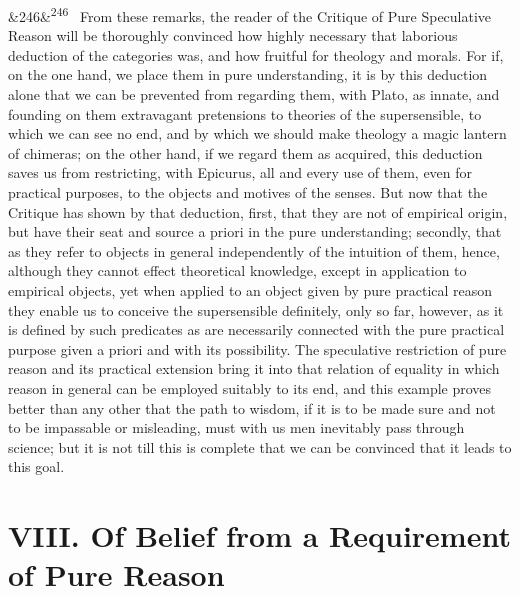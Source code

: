 \documentclass[12pt]{article}
\newcommand{\para}[1][]{\par\noindent\ifx&#1&\else\textsuperscript{\footnotesize #1}~\fi}
\begin{document}
\para[246] From these remarks, the reader of the Critique of Pure Speculative Reason will be thoroughly convinced how highly necessary that laborious deduction of the categories was, and how fruitful for theology and morals. For if, on the one hand, we place them in pure understanding, it is by this deduction alone that we can be prevented from regarding them, with Plato, as innate, and founding on them extravagant pretensions to theories of the supersensible, to which we can see no end, and by which we should make theology a magic lantern of chimeras; on the other hand, if we regard them as acquired, this deduction saves us from restricting, with Epicurus, all and every use of them, even for practical purposes, to the objects and motives of the senses. But now that the Critique has shown by that deduction, first, that they are not of empirical origin, but have their seat and source a priori in the pure understanding; secondly, that as they refer to objects in general independently of the intuition of them, hence, although they cannot effect theoretical knowledge, except in application to empirical objects, yet when applied to an object given by pure practical reason they enable us to conceive the supersensible definitely, only so far, however, as it is defined by such predicates as are necessarily connected with the pure practical purpose given a priori and with its possibility. The speculative restriction of pure reason and its practical extension bring it into that relation of equality in which reason in general can be employed suitably to its end, and this example proves better than any other that the path to wisdom, if it is to be made sure and not to be impassable or misleading, must with us men inevitably pass through science; but it is not till this is complete that we can be convinced that it leads to this goal.

\section*{VIII. Of Belief from a Requirement of Pure Reason}
\end{document}
